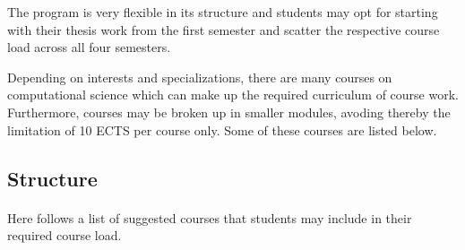\documentclass[%
twoside,                 %
final,                   %
10pt]{article}
\begin{document}
\noindent
The program is very flexible in its structure and students may opt for starting with their thesis
work from the first semester and scatter the respective course load across all four semesters.

Depending on interests and specializations, there are many courses on computational science which can make
up the required curriculum of course work. Furthermore, courses may be broken up in smaller modules,
avoding thereby the limitation of 10 ECTS per course only. Some of these courses are listed below.




\subsection*{Structure}

\paragraph{}
Here follows a list of suggested courses that students may include in their required course load.
\end{document}
